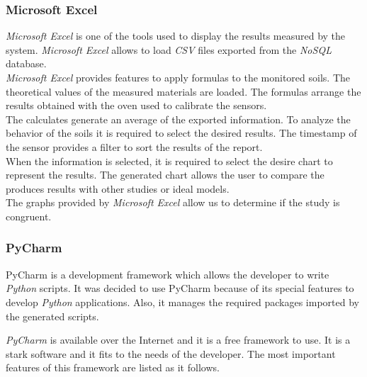 \subsubsection{Microsoft Excel}

\textit{Microsoft Excel} is one of the tools used to display the results measured by the system. \textit{Microsoft Excel} allows to load \textit{CSV} files exported from the \textit{NoSQL} database.\\

\textit{Microsoft Excel} provides features to apply formulas to the monitored soils. The theoretical values of the measured materials are loaded. The formulas arrange the results obtained with the oven used to calibrate the sensors.\\

The calculates generate an average of the exported information. To analyze the behavior of the soils it is required to select the desired results. The timestamp of the sensor provides a filter to sort the results of the report.\\

When the information is selected, it is required to select the desire chart to represent the results. The generated chart allows the user to compare the produces results with other studies or ideal models.\\

The graphs provided by \textit{Microsoft Excel} allow us to determine if the study is congruent.

\subsubsection{PyCharm}

PyCharm is a development framework which allows the developer to write \textit{Python} scripts. It was decided to use PyCharm because of its special features to develop \textit{Python} applications. Also, it manages the required packages imported by the generated scripts.

\textit{PyCharm} is available over the Internet and it is a free framework to use. It is a stark software and it fits to the needs of the developer. The most important features of this framework are listed as it follows.

